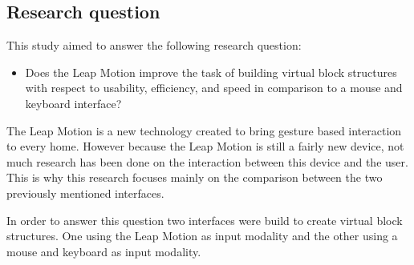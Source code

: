 \subsection{Research question}
This study aimed to answer the following research question:
\begin{itemize}
\item Does the Leap Motion improve the task of building virtual block structures with respect to usability, efficiency, and speed in comparison to a mouse and keyboard interface?
\end{itemize}
The Leap Motion is a new technology created to bring gesture based interaction to every home. 
However because the Leap Motion is still a fairly new device, not much research has been done on the interaction between this device and the user.
This is why this research focuses mainly on the comparison between the two previously mentioned interfaces.  

In order to answer this question two interfaces were build to create virtual block structures. 
One using the Leap Motion as input modality and the other using a mouse and keyboard as input modality. 